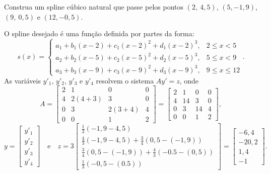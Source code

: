 \begin{ex}Construa um spline cúbico natural que passe pelos pontos $(2,~4,5)$, $(5,-1,9)$, $(9,~0,5)$ e $(12,-0,5)$.
\end{ex}
\begin{sol}
O spline desejado é uma função definida por partes da forma:
\begin{equation}
	s(x)=\left\{\begin{array}{ll}
		a_1+b_1(x-2)+c_1(x-2)^2+d_1(x-2)^3 ,& 2\leq x <5\\
	    a_2+b_2(x-5)+c_2(x-5)^2+d_2(x-5)^3 ,& 5\leq x <9\\
	    a_3+b_3(x-9)+c_3(x-9)^2+d_3(x-9)^3 ,& 9\leq x \leq 12
	\end{array}\right..
\end{equation}
As variáveis $y'_1$, $y'_2$, $y'_3$ e $y'_4$ resolvem o sistema $Ay' = z$, onde
\begin{equation}
	A = \begin{bmatrix}
		2 &1&0&0 \\
		4&2(4+3)&3&0\\
		0&3&2(3+4)&4\\
		0&0&1&2
	\end{bmatrix} = \begin{bmatrix}
		2 &1&0&0 \\
		4&14&3&0\\
		0&3&14&4\\
		0&0&1&2
	\end{bmatrix}  ,
\end{equation}
\begin{equation}
	y = \begin{bmatrix}
		y'_1\\
		y'_2\\
		y'_3\\
		y'_4
	\end{bmatrix} \quad \text{e}\quad
	z = 3\begin{bmatrix}
		\frac{1}{3}(-1,9-4,5)\\
		\frac{4}{3}(-1,9-4,5)+\frac{3}{4}(0,5-(-1,9))\\
		\frac{3}{4}(0,5-(-1,9))+\frac{4}{3}(-0.5-(0,5))\\
		\frac{1}{3}(-0,5-(0.5))
	\end{bmatrix} = \begin{bmatrix}
		-6,4\\
		-20,2\\
		1,4\\
		-1
	\end{bmatrix} .
\end{equation}

\end{sol}
